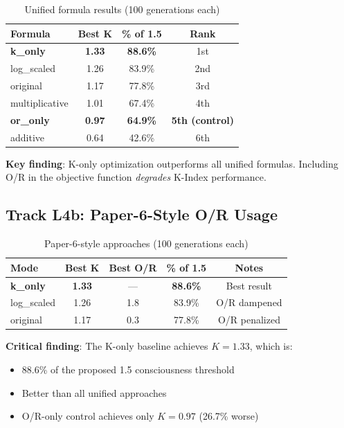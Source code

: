 \documentclass[twoside]{article}
\theoremstyle{remark}
\begin{document}
\begin{table}[h]
\centering
\caption{Unified formula results (100 generations each)}
\label{tab:formulas_results}
\begin{tabular}{@{}lccc@{}}
\toprule
\textbf{Formula} & \textbf{Best K} & \textbf{\% of 1.5} & \textbf{Rank} \\
\midrule
\textbf{k\_only} & \textbf{1.33} & \textbf{88.6\%} & 1st \\
log\_scaled & 1.26 & 83.9\% & 2nd \\
original & 1.17 & 77.8\% & 3rd \\
multiplicative & 1.01 & 67.4\% & 4th \\
\textbf{or\_only} & \textbf{0.97} & \textbf{64.9\%} & \textbf{5th (control)} \\
additive & 0.64 & 42.6\% & 6th \\
\bottomrule
\end{tabular}
\end{table}

\textbf{Key finding}: K-only optimization outperforms all unified formulas.
Including O/R in the objective function \emph{degrades} K-Index performance.

\subsection{Track L4b: Paper-6-Style O/R Usage}

\begin{table}[h]
\centering
\caption{Paper-6-style approaches (100 generations each)}
\label{tab:paper6}
\begin{tabular}{@{}lcccc@{}}
\toprule
\textbf{Mode} & \textbf{Best K} & \textbf{Best O/R} & \textbf{\% of 1.5} & \textbf{Notes} \\
\midrule
\textbf{k\_only} & \textbf{1.33} & --- & \textbf{88.6\%} & Best result \\
log\_scaled & 1.26 & 1.8 & 83.9\% & O/R dampened \\
original & 1.17 & 0.3 & 77.8\% & O/R penalized \\
\bottomrule
\end{tabular}
\end{table}

\textbf{Critical finding}: The K-only baseline achieves $K = 1.33$, which is:
\begin{itemize}
    \item 88.6\% of the proposed 1.5 consciousness threshold
    \item Better than all unified approaches
    \item O/R-only control achieves only $K = 0.97$ (26.7\% worse)
\end{itemize}
\end{document}

